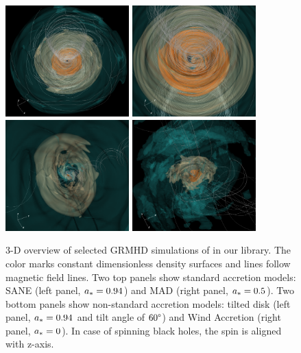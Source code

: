 \begin{figure}
  \centering
  \includegraphics[width=0.425\textwidth]{figures/sane_3D_final.png}\hspace{1.5pt}%
  \includegraphics[width=0.425\textwidth]{figures/mad_3D_final.png}\\
  \includegraphics[width=0.425\textwidth]{figures/tilted_3D_final.png}\hspace{1.5pt}%
  \includegraphics[width=0.425\textwidth]{figures/ressler_3D_final.png}
  \caption{3-D overview of selected GRMHD simulations of \sgra in our library.
    The color marks constant dimensionless density surfaces and lines follow magnetic field lines.
    Two top panels show standard accretion models: SANE (left panel, $a_*=0.94$) and MAD (right panel, $a_*=0.5$).
    Two bottom panels show non-standard accretion models: tilted disk (left panel, $a_*=0.94$ and tilt angle of $60\degree$) and Wind Accretion (right panel, $a_*=0$).
    In case of spinning black holes, the spin is aligned with z-axis.}
  \label{fig:GRMHD}
\end{figure}

